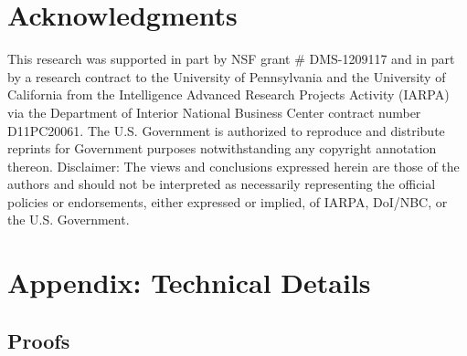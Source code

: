 \documentclass[11pt]{article}
\theoremstyle{definition}
\theoremstyle{definition}
\begin{document}
\section*{Acknowledgments} 
This research was supported in part by NSF grant \# DMS-1209117 and in part by a research contract to the University
of Pennsylvania and the University of California from the Intelligence
Advanced Research Projects Activity (IARPA) via the Department of
Interior National Business Center contract number D11PC20061. The
U.S. Government is authorized to reproduce and distribute reprints for
Government purposes notwithstanding any copyright annotation
thereon. Disclaimer: The views and conclusions expressed herein are
those of the authors and should not be interpreted as necessarily
representing the official policies or endorsements, either expressed
or implied, of IARPA, DoI/NBC, or the U.S. Government.


\appendix 
\section*{Appendix: Technical Details}
\label{appendix}

\renewcommand{\thesubsection}{\Alph{subsection}}

\subsection{Proofs}
\end{document}
